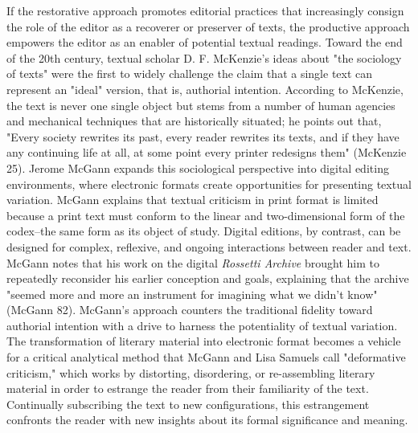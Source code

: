 \documentclass[11pt]{article}
\begin{document}
If the restorative approach promotes editorial practices that
increasingly consign the role of the editor as a recoverer or
preserver of texts, the productive approach empowers the editor as an
enabler of potential textual readings. Toward the end of the 20th
century, textual scholar D. F. McKenzie's ideas about "the sociology
of texts" were the first to widely challenge the claim that a single
text can represent an "ideal" version, that is, authorial
intention. According to McKenzie, the text is never one single object
but stems from a number of human agencies and mechanical techniques
that are historically situated; he points out that, "Every society
rewrites its past, every reader rewrites its texts, and if they have
any continuing life at all, at some point every printer redesigns
them" (McKenzie 25). Jerome McGann expands this sociological
perspective into digital editing environments, where electronic
formats create opportunities for presenting textual variation. McGann
explains that textual criticism in print format is limited because a
print text must conform to the linear and two-dimensional form of the
codex--the same form as its object of study. Digital editions, by
contrast, can be designed for complex, reflexive, and ongoing
interactions between reader and text. McGann notes that his work on
the digital \emph{Rossetti Archive} brought him to repeatedly reconsider
his earlier conception and goals, explaining that the archive "seemed
more and more an instrument for imagining what we didn't know" (McGann
82). McGann's approach counters the traditional fidelity toward
authorial intention with a drive to harness the potentiality of
textual variation. The transformation of literary material into
electronic format becomes a vehicle for a critical analytical method
that McGann and Lisa Samuels call "deformative criticism," which works
by distorting, disordering, or re-assembling literary material in
order to estrange the reader from their familiarity of the
text. Continually subscribing the text to new configurations, this
estrangement confronts the reader with new insights about its formal
significance and meaning.
\end{document}
